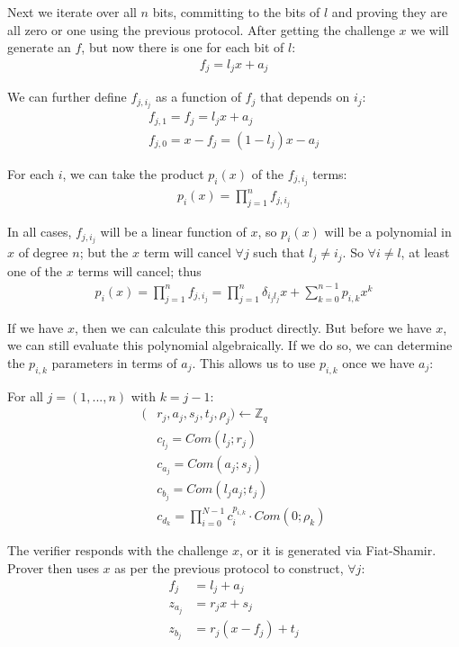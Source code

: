 \documentclass{article}
\begin{document}
Next we iterate over all $n$ bits, committing to the bits of $l$ and proving they are all zero or one using the previous protocol.  After getting the challenge $x$ we will generate an $f$, but now there is one for each bit of $l$:
\begin{align}
  f_j = l_j x + a_j
\end{align}

We can further define $f_{j, i_j}$ as a function of $f_j$ that depends on $i_j$:
\begin{align}
  f_{j,1} = f_j = l_j x + a_j\\
  f_{j,0} = x - f_j = (1 - l_j) x - a_j
\end{align}

For each $i$, we can take the product $p_i(x)$ of the $f_{j, i_j}$ terms:
\begin{align}
  p_i(x) = \prod_{j=1}^{n} f_{j, i_j}
\end{align}

In all cases, $f_{j, i_j}$ will be a linear function of $x$, so $p_i(x)$ will be a polynomial in $x$ of degree $n$; but the $x$ term will cancel $\forall j$ such that $l_j \ne i_j$.  So $\forall i \ne l$, at least one of the $x$ terms will cancel; thus
\begin{align}
  p_i(x) = \prod_{j=1}^n f_{j,i_j} = {\prod_{j=1}^{n}\delta_{i_jl_j} x} + \sum_{k=0}^{n-1}{p_{i,k} x^k}
\end{align}

If we have $x$, then we can calculate this product directly.  But before we have $x$, we can still evaluate this polynomial algebraically.  If we do so, we can determine the $p_{i,k}$ parameters in terms of $a_j$.  This allows us to use $p_{i,k}$ once we have $a_j$:

For all $j = (1, ..., n)$ with $k = j - 1$:
\begin{align}
  (&r_j, a_j, s_j, t_j, \rho_j) \longleftarrow \mathbb{Z}_q\\
  &c_{l_j} = Com(l_j; r_j)\\
  &c_{a_j} = Com(a_j; s_j)\\
  &c_{b_j} = Com(l_j a_j; t_j)\\
  &c_{d_k} = \prod_{i=0}^{N-1}{c_i^{p_{i,k}}} \cdot Com(0; \rho_k)
\end{align}

The verifier responds with the challenge $x$, or it is generated via Fiat-Shamir.  Prover then uses $x$ as per the previous protocol to construct, $\forall j$:
\begin{align}
  f_j &= l_j + a_j\\
  z_{a_j} &= r_j x + s_j\\
  z_{b_j} &= r_j (x - f_j) + t_j
\end{align}
\end{document}
